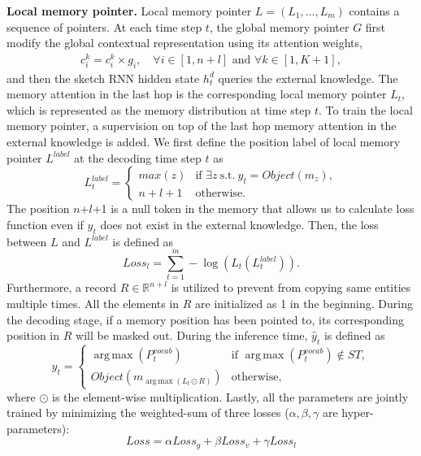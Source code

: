 \documentclass{article} \usepackage{iclr2019_conference,times}
\newcommand{\R}{\mathbb{R}}
\DeclareMathOperator*{\argmax}{arg\,max}
\begin{document}
\textbf{Local memory pointer.} 
Local memory pointer $L = (L_1,\dots,L_m)$ contains a sequence of pointers. At each time step $t$, the global memory pointer $G$ first modify the global contextual representation using its attention weights,  
\begin{equation}
    \begin{array}{c}
        c^k_i = c^k_i \times g_i, \quad \forall i \in [1,n+l] \text{ and } \forall k \in [1,K+1],
    \end{array}
\end{equation}
and then the sketch RNN hidden state $h^d_t$ queries the external knowledge. The memory attention in the last hop is the corresponding local memory pointer $L_t$, which is represented as the memory distribution at time step $t$. To train the local memory pointer, a supervision on top of the last hop memory attention in the external knowledge is added. We first define the position label of local memory pointer $L^{label}$ at the decoding time step $t$ as
\begin{equation}
    L^{label}_t = 
    \begin{cases} 
        max(z) &\mbox{if } \exists z \ \text{s.t.} \ y_t = Object(m_z), \\ 
        n+l+1  &\mbox{otherwise.} 
    \end{cases} 
\end{equation}
The position $n$+$l$+1 is a null token in the memory that allows us to calculate loss function even if $y_t$ does not exist in the external knowledge. Then, the loss between $L$ and $L^{label}$ is defined as 
\begin{equation}
Loss_l = \sum_{t=1}^{m} - \log(L_t(L^{label}_t)).
\end{equation}
Furthermore, a record $R \in \R^{n+l}$ is utilized to prevent from copying same entities multiple times. All the elements in $R$ are initialized as 1 in the beginning. During the decoding stage, if a memory position has been pointed to, its corresponding position in $R$ will be masked out. During the inference time, $\hat{y}_t$ is defined as
\begin{equation}
    \hat{y}_t = 
    \begin{cases} 
        \argmax(P^{vocab}_t) &\mbox{if } \argmax(P^{vocab}_t) \not\in ST, \\ 
        Object(m_{\argmax(L_t \odot R)})  &\mbox{otherwise,} 
    \end{cases} 
\end{equation}
where $\odot$ is the element-wise multiplication. Lastly, all the parameters are jointly trained by minimizing the weighted-sum of three losses ($\alpha, \beta, \gamma$ are hyper-parameters):
\begin{equation}
Loss = \alpha Loss_g + \beta Loss_v + \gamma Loss_l 
\end{equation}
\end{document}
